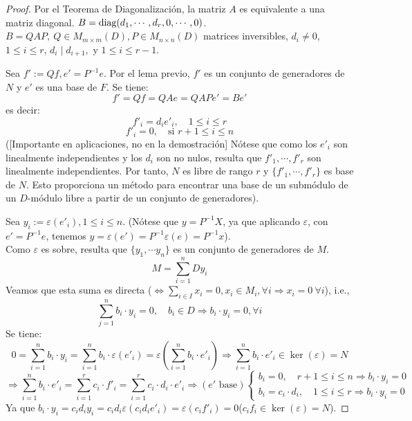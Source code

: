 \documentclass{article}
\theoremstyle{theorem-style}  %
\theoremstyle{definition}
\theoremstyle{example-style}
\begin{document}
\begin{proof}
		Por el Teorema de Diagonalización, la matriz $ A $ es equivalente a una matriz diagonal. $ B= \text{diag}(d_1, \cdots,\\ d_r, 0, \cdots, 0)$.
		$ B= QAP,\  Q\in M_{m\times m} (D), P\in M_{n\times n} (D) $ matrices inversibles, $ d_i\neq 0 $, $ 1 \leq i \leq r$, $d_i \mid d_{i+1}, \text{ y } 1 \leq i \leq r-1 $.

		Sea $ f':=Qf, e'=P^{-1}e $.
		Por el lema previo, $ f' $ es un conjunto de generadores de $ N $ y $ e' $ es una base de $ F $.
		Se tiene:
		\[ f'=Qf=QAe=QAPe'=Be' \]
		es decir:
		\[ f'_i=d_ie'_i, \quad 1 \leq i \leq r \]
		\[ f'_i =0,  \quad \text{si } r+1 \leq i \leq n\]
		([Importante en aplicaciones, no en la demostración] Nótese que como los $ e'_i $ son linealmente independientes y los $ d_i $ son no nulos, resulta que $ f'_1, \cdots, f'_r $ son linealmente independientes. Por tanto, $ N $ es libre de rango $ r $ y $ \{ f'_1, \cdots, f'_r\} $ es base de $ N $. Esto proporciona un método para encontrar una base de un submódulo de un $ D $-módulo libre a partir de un conjunto de generadores).

		Sea $y_i := \varepsilon(e'_i), 1 \leq i \leq n$. (Nótese que $ y=P^{-1}X $, ya que aplicando $\varepsilon $, con $ e'=P^{-1}e $, tenemos $ y=\varepsilon(e')=P^{-1}\varepsilon(e)=P^{-1}x $).\\
		Como $ \varepsilon $ es sobre, resulta que $ \{y_1, \cdots y_n \} $ es un conjunto de generadores de $ M $.
		\[ M=\sum_{i=1}^{n}Dy_i\]
		Veamos que esta suma es directa ($ \Leftrightarrow \sum_{i\in I} x_i=0, x_i\in M_i, \forall i \Rightarrow x_i=0\ \forall i $), i.e.,
		\[ \sum_{j=1}^{n} b_i\cdot y_i=0, \quad b_i \in D \Rightarrow b_i\cdot y_i=0, \forall i \]
		Se tiene:
		\[ 0=\sum_{i=1}^{n} b_i \cdot y_i = \sum_{i=1}^{n} b_i \cdot \varepsilon(e'_i)=\varepsilon (\sum_{i=1}^{n} b_i \cdot e'_i)\Rightarrow \sum_{i=1}^{n} b_i \cdot e'_i \in \ker(\varepsilon)=N \]
		\[ \Rightarrow \sum_{i=1}^{n} b_i \cdot e'_i=\sum_{i=1}^{r} c_i \cdot f'_i= \sum_{i=1}^{r} c_i \cdot d_i \cdot e'_i \Rightarrow (e'\text{ base}) \begin{cases}
		b_i=0, \quad r+1 \leq i \leq n \Rightarrow b_i \cdot y_i =0\\
		b_i=c_i\cdot d_i, \quad 1 \leq i \leq r \Rightarrow b_i\cdot y_i=0
		\end{cases}\]
		Ya que $ b_i\cdot y_i=c_id_iy_i=c_id_i\varepsilon(c_id_ie'_i)=\varepsilon(c_if'_i)=0 $($c_if_i\in \ker(\varepsilon)=N$).


\end{proof}
\end{document}
